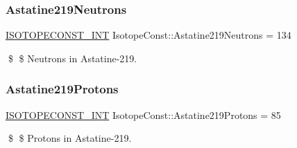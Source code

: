 \subsubsection{\texorpdfstring{Astatine219\+Neutrons}{Astatine219Neutrons}}
{\footnotesize\ttfamily \mbox{\hyperlink{group___isotope_const-_macros_ga5f18360b3e99483a35c32d789e62621c}{I\+S\+O\+T\+O\+P\+E\+C\+O\+N\+S\+T\+\_\+\+I\+NT}} Isotope\+Const\+::\+Astatine219\+Neutrons = 134}

\$ \$ Neutrons in Astatine-\/219. \mbox{\label{group___isotope_const-_astatine-_at219_gac90f7175a1cf4ac277dd4b725090cce3}} 
\subsubsection{\texorpdfstring{Astatine219\+Protons}{Astatine219Protons}}
{\footnotesize\ttfamily \mbox{\hyperlink{group___isotope_const-_macros_ga5f18360b3e99483a35c32d789e62621c}{I\+S\+O\+T\+O\+P\+E\+C\+O\+N\+S\+T\+\_\+\+I\+NT}} Isotope\+Const\+::\+Astatine219\+Protons = 85}

\$ \$ Protons in Astatine-\/219. 